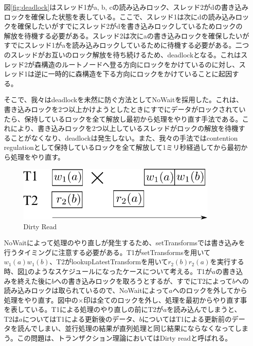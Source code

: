 \documentclass[a4paper]{jreport}	%
\begin{document}
図\ref{fig:deadlock}はスレッド1がa, b, cの読み込みロック、スレッド2がdの書き込みロックを確保した状態を表している。ここで、スレッド1は次にdの読み込みロックを確保したいがすでにスレッド2がdを書き込みロックしているためロックの解放を待機する必要がある。スレッド2は次にaの書き込みロックを確保したいがすでにスレッド1がaを読み込みロックしているために待機する必要がある。二つのスレッドがお互いのロック解放を待ち続けるため、deadlockとなる。これはスレッド2が森構造のルートノードへ登る方向にロックをかけているのに対し、スレッド1は逆に一時的に森構造を下る方向にロックをかけていることに起因する。


そこで、我々はdeadlockを未然に防ぐ方法としてNoWait\cite{nowait}を採用した。これは、書き込みロックを2つ以上かけようとしたときにすでにデータがロックされていたら、保持しているロックを全て解放し最初から処理をやり直す手法である。これにより、書き込みロックを2つ以上しているスレッドがロックの解放を待機することがなくなり、deadlockは発生しない。また、我々の手法ではcontention regulationとして保持しているロックを全て解放して1ミリ秒経過してから最初から処理をやり直す。

\begin{figure}[h] 
\centering
\includegraphics[width=10cm]{dirty-read}
\caption{Dirty Read}
\label{fig:dirty-read}
\end{figure}


NoWaitによって処理のやり直しが発生するため、setTransformsでは書き込みを行うタイミングに注意する必要がある。T1がsetTransformsを用いて$w_1(a)w_1(b)$、T2がlookupLatestTransformを用いて$r_2(b)r_2(a)$を実行する時、図\ref{fig:dirty-read}のようなスケジュールになったケースについて考える。T1が$a$の書き込みを終えた後に$b$への書き込みロックを取ろうとするが、すでにT2によって$b$への読み込みロックは取られているので、NoWaitによって$a$へのロックを外してから処理をやり直す。図中の$\times$印は全てのロックを外し、処理を最初からやり直す事を表している。T1による処理のやり直しの前にT2が$a$を読み込んでしまうと、T2は$a$についてはT1による更新後のデータ、$b$についてはT1による更新前のデータを読んでしまい、並行処理の結果が直列処理と同じ結果にならなくなってしまう。この問題は、トランザクション理論においてはDirty readと呼ばれる。
\end{document}
